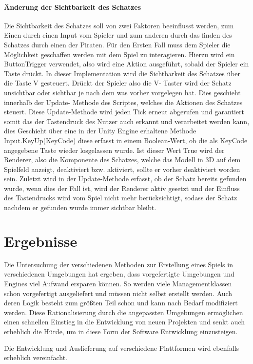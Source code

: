 \documentclass[
	12pt, %
	a4paper,
	listof=totoc, %
	bibliography=totoc, %
	numbers=noenddot, %
	ngerman, %
	headsepline, %
	oneside %
	]{scrbook} %
\begin{document}
{\subsubsection{Änderung der Sichtbarkeit des Schatzes}
Die Sichtbarkeit des Schatzes soll von zwei Faktoren beeinflusst werden, zum Einen durch einen Input vom Spieler und zum anderen durch das finden des Schatzes durch einen der Piraten. Für den Ersten Fall muss dem Spieler die Möglichkeit geschaffen werden mit dem Spiel zu interagieren. Hierzu wird ein ButtonTrigger verwendet, also wird eine Aktion ausgeführt, sobald der Spieler ein Taste drückt. In dieser Implementation wird die Sichtbarkeit des Schatzes über die Taste V gesteuert. Drückt der Spieler also die V- Taster wird der Schatz unsichtbar oder sichtbar je nach dem was vorher vorgelegen hat. Dies geschieht innerhalb der Update- Methode des Scriptes, welches die Aktionen des Schatzes steuert. Diese Update-Methode wird jeden Tick erneut abgerufen und garantiert somit das der Tastendruck des Nutzer auch erkannt und verarbeitet werden kann, dies Geschieht über eine in der Unity Engine erhaltene Methode Input.KeyUp(KeyCode) diese erfasst in einem Boolean-Wert, ob die als KeyCode angegebene Taste wieder losgelassen wurde. Ist dieser Wert True wird der Renderer, also die Komponente des Schatzes, welche das Modell in 3D auf dem Spielfeld anzeigt, deaktiviert bzw. aktiviert, sollte er vorher deaktiviert worden sein. Zuletzt wird in der Update-Methode erfasst, ob der Schatz bereits gefunden wurde, wenn dies der Fall ist, wird der Renderer aktiv gesetzt und der Einfluss des Tastendrucks wird vom Spiel nicht mehr berücksichtigt, sodass der Schatz nachdem er gefunden wurde immer sichtbar bleibt.


\chapter{Ergebnisse}
Die Untersuchung der verschiedenen Methoden zur Erstellung eines Spiels in verschiedenen Umgebungen hat ergeben, dass vorgefertigte Umgebungen und Engines viel Aufwand ersparen können. So werden viele Managementklassen schon vorgefertigt ausgeliefert und müssen nicht selbst erstellt werden. Auch deren Logik besteht zum größten Teil schon und kann nach Bedarf modifiziert werden.  
Diese Rationalisierung durch die angepassten Umgebungen ermöglichen einen schnellen Einstieg in die Entwicklung von neuen Projekten und senkt auch erheblich die Hürde, um in diese Form der Software Entwicklung einzusteigen.

Die Entwicklung und Auslieferung auf verschiedene Plattformen wird ebenfalls erheblich vereinfacht.

}
\end{document}
